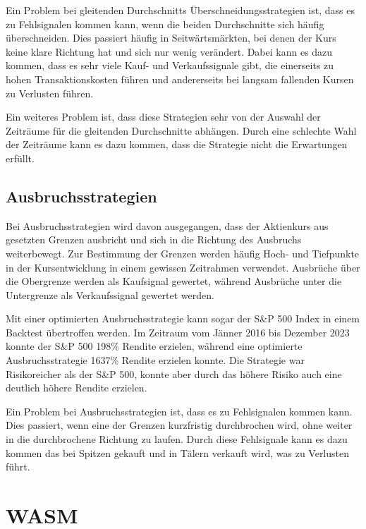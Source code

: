 Ein Problem bei gleitenden Durchschnitts Überschneidungsstrategien ist, dass es zu Fehlsignalen kommen kann, wenn die beiden Durchschnitte sich häufig überschneiden.
Dies passiert häufig in Seitwärtsmärkten, bei denen der Kurs keine klare Richtung hat und sich nur wenig verändert.
Dabei kann es dazu kommen, dass es sehr viele Kauf- und Verkaufssignale gibt, die einerseits zu hohen Transaktionskosten führen und andererseits bei langsam fallenden Kursen zu Verlusten führen.
\cite{arumugam2017empirical}

Ein weiteres Problem ist, dass diese Strategien sehr von der Auswahl der Zeiträume für die gleitenden Durchschnitte abhängen.
Durch eine schlechte Wahl der Zeiträume kann es dazu kommen, dass die Strategie nicht die Erwartungen erfüllt.
\cite{ferreira2018detailed}

\subsection{Ausbruchsstrategien}
\label{subsec:Ausbruchsstrategien}

Bei Ausbruchsstrategien wird davon ausgegangen, dass der Aktienkurs aus gesetzten Grenzen ausbricht und sich in die Richtung des Ausbruchs weiterbewegt.
Zur Bestimmung der Grenzen werden häufig Hoch- und Tiefpunkte in der Kursentwicklung in einem gewissen Zeitrahmen verwendet.
Ausbrüche über die Obergrenze werden als Kaufsignal gewertet, während Ausbrüche unter die Untergrenze als Verkaufssignal gewertet werden.
\cite{HOLMBERG201327} \cite{wright2024breakout}

Mit einer optimierten Ausbruchsstrategie kann sogar der S\&P 500 Index in einem Backtest übertroffen werden. Im Zeitraum vom Jänner 2016 bis Dezember 2023 konnte der S\&P 500 198\% Rendite erzielen, während eine optimierte Ausbruchsstrategie 1637\% Rendite erzielen konnte.
Die Strategie war Risikoreicher als der S\&P 500, konnte aber durch das höhere Risiko auch eine deutlich höhere Rendite erzielen.
\cite{zarattini2024profitable}

Ein Problem bei Ausbruchsstrategien ist, dass es zu Fehlsignalen kommen kann.
Dies passiert, wenn eine der Grenzen kurzfristig durchbrochen wird, ohne weiter in die durchbrochene Richtung zu laufen.
Durch diese Fehlsignale kann es dazu kommen das bei Spitzen gekauft und in Tälern verkauft wird, was zu Verlusten führt.
\cite{mitchell2023failedbreak}

\section{WASM}
\label{sec:WASM}


